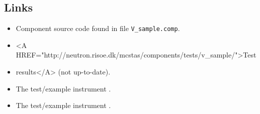 \subsection*{Links}
\begin{itemize}
  \item Component source code found in file \texttt{V\_sample.comp}.
  \item \textless{}A HREF="http://neutron.risoe.dk/mcstas/components/tests/v\_sample/"\textgreater{}Test
  \item results\textless{}/A\textgreater{} (not up-to-date).
  \item The test/example instrument .
  \item The test/example instrument .
\end{itemize}
